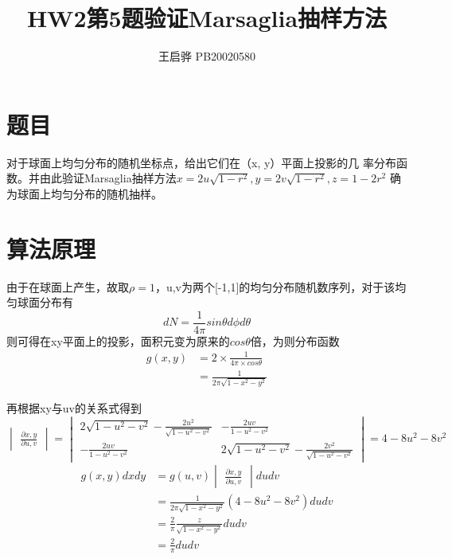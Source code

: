 \documentclass{article}
\title{\songti \zihao{2}\bfseries HW2第5题验证Marsaglia抽样方法}
\author{王启骅 PB20020580}
\begin{document}
	\maketitle
	\section{题目}
	对于球面上均匀分布的随机坐标点，给出它们在（x, y）平面上投影的几
	率分布函数。并由此验证Marsaglia抽样方法$ x=2u\sqrt{1-r^2},y=2v\sqrt{1-r^2},z=1-2r^2 $
	确为球面上均匀分布的随机抽样。
	\section{算法原理}
	由于在球面上产生，故取$ \rho=1 $，u,v为两个[-1,1]的均匀分布随机数序列，对于该均匀球面分布有
	\begin{equation}
		dN=\frac{1}{4\pi} sin\theta d\phi d\theta
	\end{equation}
	则可得在xy平面上的投影，面积元变为原来的$ cos\theta $倍，为则分布函数
	\begin{equation}
		\begin{aligned}
			g(x,y)&=2\times \frac{1}{4\pi\times cos\theta}\\
			&=\frac{1}{2\pi\sqrt{1-x^2-y^2}}
		\end{aligned}
	\end{equation}
	
	
	再根据xy与uv的关系式得到
	\begin{equation}
		\begin{vmatrix}
			\frac{\partial x,y}{\partial u,v}
		\end{vmatrix}
	=
	\begin{vmatrix}
		2\sqrt{1-u^2-v^2}-\frac{2u^2}{\sqrt{1-u^2-v^2}}&-\frac{2uv}{1-u^2-v^2}\\
		-\frac{2uv}{1-u^2-v^2}&	2\sqrt{1-u^2-v^2}-\frac{2v^2}{\sqrt{1-u^2-v^2}}
	\end{vmatrix}
=4-8u^2-8v^2
	\end{equation}
	\begin{equation}
		\begin{aligned}
			g(x,y)dxdy&=g(u,v)
				\begin{vmatrix}
				\frac{\partial x,y}{\partial u,v}
			\end{vmatrix}
		dudv\\
		&=\frac{1}{2\pi\sqrt{1-x^2-y^2}}(4-8u^2-8v^2)dudv\\
		&=\frac{2}{\pi}\frac{z}{\sqrt{1-x^2-y^2}}dudv\\
		&=\frac{2}{\pi}dudv
		\end{aligned}
	\end{equation}
\end{document}
